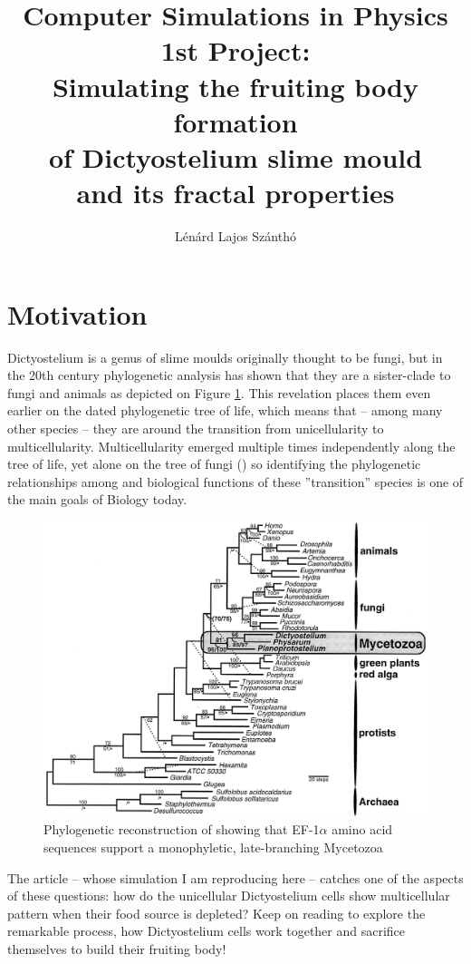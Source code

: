 \documentclass[a4paper,12pt]{article}
\author{Lénárd Lajos Szánthó}
\title{Computer Simulations in Physics 1st Project:\\ Simulating the fruiting body formation\\ of Dictyostelium slime mould\\ and its fractal properties}
\begin{document}
\maketitle

\section{Motivation}

Dictyostelium is a genus of slime moulds originally thought to be fungi, but in the 20th century phylogenetic analysis has shown \cite{baldauf1997} that they are a sister-clade to fungi and animals as depicted on Figure \ref{fig:dictyophylo}. This revelation places them even earlier on the dated phylogenetic tree of life, which means that  -- among many other species -- they are around the transition from unicellularity to multicellularity. Multicellularity emerged multiple times independently along the tree of life, yet alone on the tree of fungi (\cite{nagy2018}) so identifying the phylogenetic relationships among and biological functions of these ''transition'' species  is one of the main goals of Biology today.

\begin{figure}
\centering
 \includegraphics[width=\textwidth]{dictyophylo.jpg}
 \caption{Phylogenetic reconstruction of \cite{baldauf1997} showing that EF-1$\alpha$ amino acid sequences support a monophyletic, late-branching Mycetozoa}
 \label{fig:dictyophylo}
\end{figure}

The article \cite{kessler1993} -- whose simulation I am reproducing here -- catches one of the aspects of these questions: how do the unicellular Dictyostelium cells show multicellular pattern when their food source is depleted? Keep on reading to explore the remarkable process, how Dictyostelium cells work together and sacrifice themselves to build their fruiting body!
\end{document}
